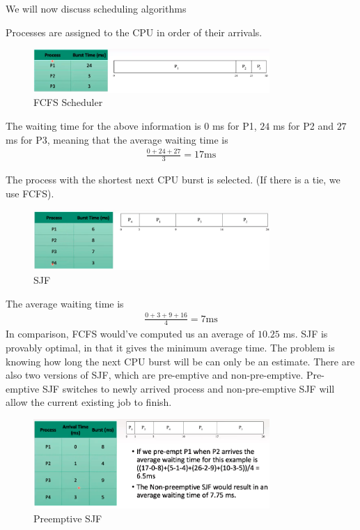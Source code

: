 \documentclass[a4paper]{article}
\theoremstyle{plain}
\theoremstyle{definition}
\newtheorem{defn}{Definition}[section]
\theoremstyle{remark}
\begin{document}
We will now discuss scheduling algorithms
\begin{tcolorbox}[colback=black!3!white,colframe=black!60!white,title=\begin{defn}First Come First Serve (FCFS) \label{First Come First Serve (FCFS)}\end{defn}]
Processes are assigned to the CPU in order of their arrivals.
\begin{figure}[H]
	\centering
	\includegraphics[width=0.8\textwidth]{thirtysix.png}
	\caption{FCFS Scheduler}
	\label{fig:thirtysix-png}
\end{figure}
The waiting time for the above information is $0$ ms for P1, $24$ ms for P2 and $27$ ms for P3, meaning that the average waiting time is
 \begin{align*}
	 \frac{0+24+27}{3}=17\text{ms}	
\end{align*}
\end{tcolorbox}
\begin{tcolorbox}[colback=black!3!white,colframe=black!60!white,title=\begin{defn}Shorest Job First (SJF) \label{Shorest Job First (SJF)}\end{defn}]
The process with the shortest next CPU burst is selected. (If there is a tie, we use FCFS).
\begin{figure}[H]
	\centering
	\includegraphics[width=0.8\textwidth]{thirtyseven.png}
	\caption{SJF}
	\label{fig:thirtyseven-png}
\end{figure}
The average waiting time is
\begin{align*}
	\frac{0+3+9+16}{4}=7\text{ms}
\end{align*}
In comparison, FCFS would've computed us an average of $10.25$ ms. 
SJF is provably optimal, in that it gives the minimum average time. The problem is knowing how long the next CPU burst will be can only be an estimate. There are also two versions of SJF, which are pre-emptive and non-pre-emptive. Pre-emptive SJF switches to newly arrived process and non-pre-emptive SJF will allow the current existing job to finish.
\begin{figure}[H]
	\centering
	\includegraphics[width=0.8\textwidth]{thirtyeight.png}
	\caption{Preemptive SJF}
	\label{fig:thirtyeight-png}
\end{figure}
\end{tcolorbox}
\end{document}
